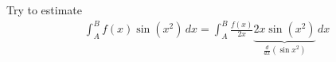 \begin{example*}
Try to estimate 
\begin{align*}
  \int_A^B f(x)\sin(x^2) \,dx =  \int_A^B \frac{f(x)}{2x}\underbrace{2x\sin(x^2)}_{\frac{d}{dx}(\sin x^2)} \,dx 
\end{align*}
\end{example*}
